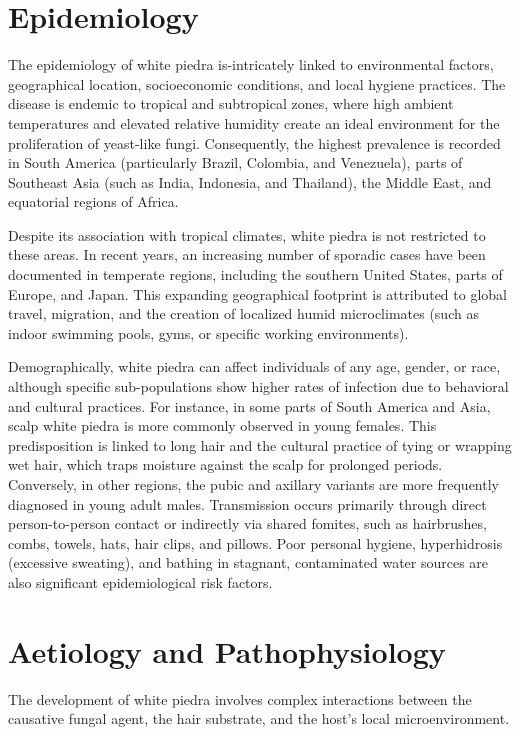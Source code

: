 \section*{Epidemiology}
The epidemiology of white piedra is-intricately linked to environmental factors, geographical location, socioeconomic conditions, and local hygiene practices. The disease is endemic to tropical and subtropical zones, where high ambient temperatures and elevated relative humidity create an ideal environment for the proliferation of yeast-like fungi. Consequently, the highest prevalence is recorded in South America (particularly Brazil, Colombia, and Venezuela), parts of Southeast Asia (such as India, Indonesia, and Thailand), the Middle East, and equatorial regions of Africa.

Despite its association with tropical climates, white piedra is not restricted to these areas. In recent years, an increasing number of sporadic cases have been documented in temperate regions, including the southern United States, parts of Europe, and Japan. This expanding geographical footprint is attributed to global travel, migration, and the creation of localized humid microclimates (such as indoor swimming pools, gyms, or specific working environments).

Demographically, white piedra can affect individuals of any age, gender, or race, although specific sub-populations show higher rates of infection due to behavioral and cultural practices. For instance, in some parts of South America and Asia, scalp white piedra is more commonly observed in young females. This predisposition is linked to long hair and the cultural practice of tying or wrapping wet hair, which traps moisture against the scalp for prolonged periods. Conversely, in other regions, the pubic and axillary variants are more frequently diagnosed in young adult males. Transmission occurs primarily through direct person-to-person contact or indirectly via shared fomites, such as hairbrushes, combs, towels, hats, hair clips, and pillows. Poor personal hygiene, hyperhidrosis (excessive sweating), and bathing in stagnant, contaminated water sources are also significant epidemiological risk factors.

\section*{Aetiology and Pathophysiology}
The development of white piedra involves complex interactions between the causative fungal agent, the hair substrate, and the host's local microenvironment.

